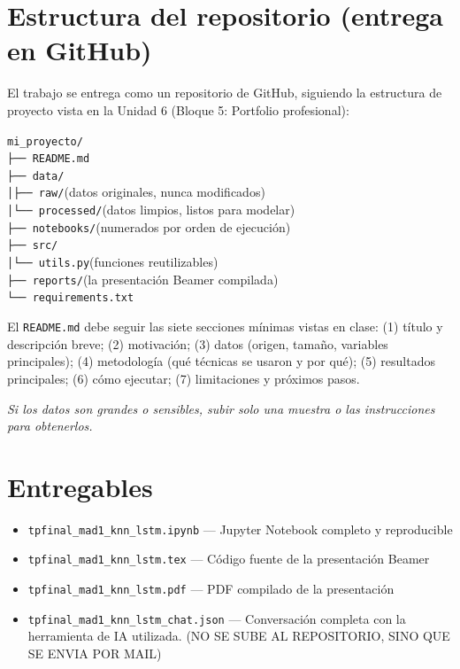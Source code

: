 \documentclass[11pt,a4paper]{article}
\newcommand{\codigo}[1]{\texttt{#1}}
\begin{document}
\section{Estructura del repositorio (entrega en GitHub)}
El trabajo se entrega como un repositorio de GitHub, siguiendo la estructura de proyecto vista en la Unidad 6 (Bloque 5: Portfolio profesional):
\begin{center}
\begin{minipage}{0.82\textwidth}
\codigo{mi\_proyecto/}\\
\codigo{\phantom{x}├── README.md}\\
\codigo{\phantom{x}├── data/}\\
\codigo{\phantom{x}│\phantom{xx}├── raw/}\hfill (datos originales, nunca modificados)\\
\codigo{\phantom{x}│\phantom{xx}└── processed/}\hfill (datos limpios, listos para modelar)\\
\codigo{\phantom{x}├── notebooks/}\hfill (numerados por orden de ejecuci\'on)\\
\codigo{\phantom{x}├── src/}\\
\codigo{\phantom{x}│\phantom{xx}└── utils.py}\hfill (funciones reutilizables)\\
\codigo{\phantom{x}├── reports/}\hfill (la presentaci\'on Beamer compilada)\\
\codigo{\phantom{x}└── requirements.txt}
\end{minipage}
\end{center}

El \codigo{README.md} debe seguir las siete secciones m\'inimas vistas en clase: (1) t\'itulo y descripci\'on breve; (2) motivaci\'on; (3) datos (origen, tama\~no, variables principales); (4) metodolog\'ia (qu\'e t\'ecnicas se usaron y por qu\'e); (5) resultados principales; (6) c\'omo ejecutar; (7) limitaciones y pr\'oximos pasos.

\textit{Si los datos son grandes o sensibles, subir solo una muestra o las instrucciones para obtenerlos.}

\section{Entregables}
\begin{itemize}[leftmargin=2em,itemsep=2pt]
    \item \codigo{tpfinal\_mad1\_knn\_lstm.ipynb} --- Jupyter Notebook completo y reproducible
    \item \codigo{tpfinal\_mad1\_knn\_lstm.tex} --- C\'odigo fuente de la presentaci\'on Beamer
    \item \codigo{tpfinal\_mad1\_knn\_lstm.pdf} --- PDF compilado de la presentaci\'on
    \item \codigo{tpfinal\_mad1\_knn\_lstm\_chat.json} --- Conversaci\'on completa con la herramienta de IA utilizada. (NO SE SUBE AL REPOSITORIO, SINO QUE SE ENVIA POR MAIL)
\end{itemize}
\end{document}

